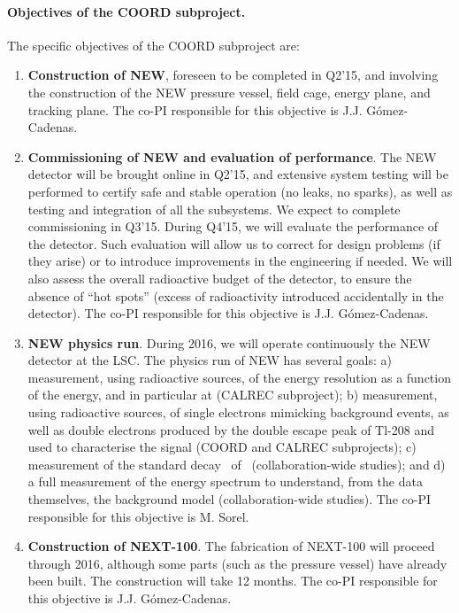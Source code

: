 \paragraph{Objectives of the COORD subproject.}
The specific objectives of the COORD subproject are:

\begin{enumerate}
\item {\bf Construction of NEW}, foreseen to be completed in Q2'15, and involving the construction of the NEW pressure vessel, field cage, energy plane, and tracking plane. The co-PI responsible for this objective is J.J. G\'omez-Cadenas.

\item {\bf Commissioning of NEW and evaluation of performance}. The NEW detector will be brought online in Q2'15, and extensive system testing will be performed to certify safe and stable operation (no leaks, no sparks), as well as testing and integration of all the subsystems. We expect to complete commissioning in Q3'15. During Q4'15, we will evaluate the performance of the detector. Such evaluation will allow us to correct for design problems (if they arise) or to introduce improvements in the engineering if needed. We will also assess the overall radioactive budget of the detector, to ensure the absence of ``hot spots'' (excess of radioactivity introduced accidentally in the detector). The co-PI responsible for this objective is J.J. G\'omez-Cadenas.

\item {\bf NEW physics run}. During 2016, we will operate continuously the NEW detector at the LSC. The physics run of NEW has several goals: a) measurement, using radioactive sources, of the energy resolution as a function of the energy, and in particular at \Qbb (CALREC subproject); b) measurement, using radioactive sources, of single electrons mimicking background events, as well as double electrons produced by the double escape peak of Tl-208 and used to characterise the signal (COORD and CALREC subprojects); c) measurement of the standard decay \bbtnu\ of \XE\ (collaboration-wide studies); and d) a full measurement of the energy spectrum to understand, from the data themselves, the background model (collaboration-wide studies). The co-PI responsible for this objective is M. Sorel.
%

\item {\bf Construction of NEXT-100}. The fabrication of NEXT-100 will proceed through 2016, although some parts (such as the pressure vessel) have already been built. The construction will take 12 months. The co-PI responsible for this objective is J.J. G\'omez-Cadenas. 


\end{enumerate}

